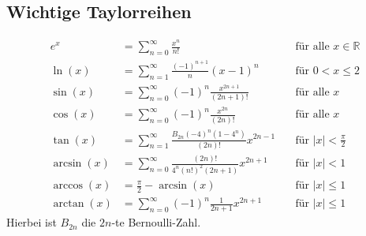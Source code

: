 \documentclass[a4paper,10pt]{article}
\def\R{\mathbb{R}}
\begin{document}
\subsection{Wichtige Taylorreihen} \label{taylorreihen}

\begin{align*}
    e^x &= \sum_{n=0}^\infty \frac{x^n}{n!} &\quad \text{für alle } x \in \R \\
    \ln(x) &= \sum_{n=1}^\infty \frac{(-1)^{n+1}}{n} (x - 1)^n &\quad \text{für } 0 < x \leq 2 \\
    \sin(x) &= \sum_{n=0}^\infty (-1)^n \frac{x^{2n+1}}{(2n + 1)!} &\quad \text{für alle } x \\
    \cos(x) &= \sum_{n=0}^\infty (-1)^n \frac{x^{2n}}{(2n)!} &\quad \text{für alle } x \\
    \tan(x) &= \sum_{n=1}^\infty \frac{B_{2n} (-4)^n (1-4^n)}{(2n)!} x^{2n-1} &\quad \text{für } \lvert x \rvert < \frac{\pi}{2} \\
    \arcsin(x) &= \sum_{n=0}^\infty \frac{(2n)!}{4^n (n!)^2 (2n +1)} x^{2n + 1} &\quad \text{für } \lvert x \rvert < 1 \\
    \arccos(x)& = \frac{\pi}{2} - \arcsin(x) &\quad \text{für } \lvert x \rvert \leq 1 \\
    \arctan(x) &=\sum_{n=0}^\infty (-1)^n \frac{1}{2n + 1} x^{2n + 1} &\quad \text{für } \lvert x \rvert \leq 1
\end{align*}
Hierbei ist \(  B_{2n} \) die \( 2n \)-te Bernoulli-Zahl.


\end{document}
